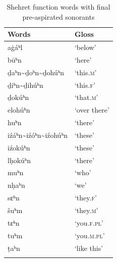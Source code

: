 \documentclass[output=paper]{langscibook}
\begin{document}
\fussy
\begin{table}
\begin{floatrow}
\ttabbox
{\begin{tabular}{ll}
\lsptoprule
{Words} & {Gloss}\\\midrule
a\.gáʰl                                             & ‘below’     \\
būʰn                                                &  ‘here’     \\
ḏaʰn{\textasciitilde}ḏoʰn{\textasciitilde}ḏohúʰn    &  ‘this.\textsc{m}’  \\
ḏiʰn{\textasciitilde}ḏihúʰn                         &  ‘this.\textsc{f}’  \\
ḏokúʰn                                              &  ‘that.\textsc{m}’  \\
elohúʰn                                             &  ‘over there’\\
huʰn                                                &  ‘there’    \\
iźáʰn{\textasciitilde}iźóʰn{\textasciitilde}iźohúʰn &  ‘these’    \\
iźokúʰn                                             &  ‘these’    \\
lḥokúʰn                                             &  ‘there’    \\
muʰn                                                &  ‘who’      \\
nḥaʰn                                               &  ‘we’       \\
sɛʰn                                                &  ‘they.\textsc{f}’  \\
šuʰm                                                &  ‘they.\textsc{m}’  \\
tɛʰn                                                &  ‘you.\textsc{f.pl}’\\
tuʰm                                                &  ‘you.\textsc{m.pl}’\\
ṭaʰn                                                &  ‘like this’\\
\lspbottomrule
\end{tabular}}
{\caption{Shehret function words with final pre-aspirated sonorants}\label{tab:watson:3}}
\end{floatrow}
\end{table}
\end{document}
